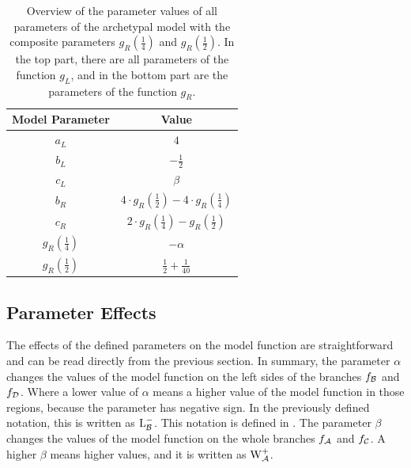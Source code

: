 \begin{table}
	\centering
	\begin{tabular}{|c|c|}
		\hline
		Model Parameter               & Value                                                                       \\ \hline \hline
		$a_L$                         & $4$                                                                         \\ \hline
		$b_L$                         & $-\frac{1}{2}$                                                              \\ \hline
		$c_L$                         & $\beta$                                                                     \\ \hline \hline
		$b_R$                         & $4 \cdot g_R\left(\frac{1}{2}\right) - 4 \cdot g_R\left(\frac{1}{4}\right)$ \\ \hline
		$c_R$                         & $2 \cdot g_R\left(\frac{1}{4}\right) - g_R\left(\frac{1}{2}\right)$         \\ \hline
		$g_R\left(\frac{1}{4}\right)$ & $-\alpha$                                                                   \\ \hline
		$g_R\left(\frac{1}{2}\right)$ & $\frac{1}{2} + \frac{1}{40}$                                                \\ \hline
	\end{tabular}
	\caption[Overview of parameters of the archetypal model]{
		Overview of the parameter values of all parameters of the archetypal model with the composite parameters $g_R\left(\frac{1}{4}\right)$ and $g_R\left(\frac{1}{2}\right)$.
		In the top part, there are all parameters of the function $g_L$, and in the bottom part are the parameters of the function $g_R$.
	}
	\label{table:setup.arch.parameters}
\end{table}

\subsection{Parameter Effects}
\label{sec:setup.arch.parameterfx}

The effects of the defined parameters on the model function are straightforward and can be read directly from the previous section.
In summary, the parameter $\alpha$ changes the values of the model function on the left sides of the branches $f_{\mathcal{B}}$ and $f_{\mathcal{D}}$.
Where a lower value of $\alpha$ means a higher value of the model function in those regions, because the parameter has negative sign.
In the previously defined notation, this is written as $\operatorname{L}_{\mathcal{B}}^-$.
This notation is defined in .
The parameter $\beta$ changes the values of the model function on the whole branches $f_{\mathcal{A}}$ and $f_{\mathcal{C}}$.
A higher $\beta$ means higher values, and it is written as $\operatorname{W}_{\mathcal{A}}^+$.


